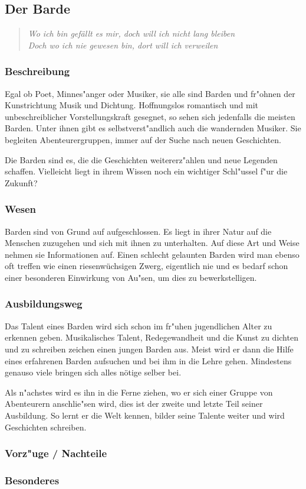 \subsection{Der Barde}
\begin{quotation}
\textit{Wo ich bin gefällt es mir, doch will ich nicht lang
bleiben}\\
\textit{Doch wo ich nie gewesen bin, dort will ich verweilen}
\end{quotation}
\subsubsection{Beschreibung}
\par Egal ob Poet, Minnes"anger oder Musiker, sie alle 
sind Barden und fr"ohnen der Kunstrichtung Musik und Dichtung. Hoffnungslos romantisch und mit unbeschreiblicher 
Vorstellungskraft gesegnet, so sehen sich jedenfalls die meisten Barden.
Unter ihnen gibt es selbstverst"andlich auch die wandernden Musiker. Sie begleiten Abenteurergruppen, immer 
auf der Suche nach neuen Geschichten.
\par Die Barden sind es, die die Geschichten weitererz"ahlen und neue Legenden schaffen. Vielleicht liegt in 
ihrem Wissen noch ein wichtiger Schl"ussel f"ur die Zukunft?
\subsubsection{Wesen}
\par Barden sind von Grund auf aufgeschlossen. Es liegt in ihrer Natur auf die Menschen zuzugehen und sich mit 
ihnen zu unterhalten. Auf diese Art und Weise nehmen sie Informationen auf. Einen schlecht gelaunten Barden wird 
man ebenso oft treffen wie einen riesenwüchsigen Zwerg, eigentlich nie und es bedarf schon einer besonderen 
Einwirkung von Au"sen, um dies zu bewerkstelligen.
\subsubsection{Ausbildungsweg}
\par Das Talent eines Barden wird sich schon im fr"uhen jugendlichen Alter zu erkennen geben. Musikalisches 
Talent, Redegewandheit und die Kunst zu dichten und zu schreiben zeichen einen jungen Barden aus. Meist wird 
er dann die Hilfe eines erfahrenen Barden aufsuchen und bei ihm in die Lehre gehen. Mindestens genauso viele 
bringen sich alles nötige selber bei. \par Als n"achstes wird es ihn in die Ferne ziehen, wo er sich einer 
Gruppe von Abenteurern anschlie"sen wird, dies ist der zweite und letzte Teil seiner Ausbildung. So lernt er 
die Welt kennen, bilder seine Talente weiter und wird Geschichten schreiben.
\subsubsection{Vorz"uge / Nachteile}
\subsubsection{Besonderes}
